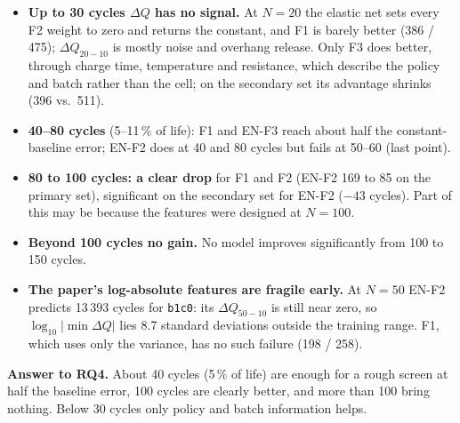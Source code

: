 \begin{itemize}
  \item \textbf{Up to 30 cycles $\Delta Q$ has no signal.} At $N=20$ the
  elastic net sets every F2 weight to zero and returns the constant, and F1
  is barely better (386 / 475); $\Delta Q_{20-10}$ is mostly noise and
  overhang release. Only F3 does better, through charge time, temperature and
  resistance, which describe the policy and batch rather than the cell; on
  the secondary set its advantage shrinks (396 vs.\ 511).
  \item \textbf{40--80 cycles} (5--11\,\% of life): F1 and EN-F3 reach about
  half the constant-baseline error; EN-F2 does at 40 and 80 cycles but fails
  at 50--60 (last point).
  \item \textbf{80 to 100 cycles: a clear drop} for F1 and F2 (EN-F2 169 to
  85 on the primary set), significant on the secondary set for EN-F2 ($-43$
  cycles). Part of this may be because the features were designed at
  $N=100$.
  \item \textbf{Beyond 100 cycles no gain.} No model improves significantly
  from 100 to 150 cycles.
  \item \textbf{The paper's log-absolute features are fragile early.} At
  $N=50$ EN-F2 predicts 13\,393 cycles for \texttt{b1c0}: its
  $\Delta Q_{50-10}$ is still near zero, so $\log_{10}|\min\Delta Q|$ lies
  8.7 standard deviations outside the training range. F1, which uses only
  the variance, has no such failure (198 / 258).
\end{itemize}

\textbf{Answer to RQ4.} About 40 cycles (5\,\% of life) are enough for a
rough screen at half the baseline error, 100 cycles are clearly better, and
more than 100 bring nothing. Below 30 cycles only policy and batch
information helps.
